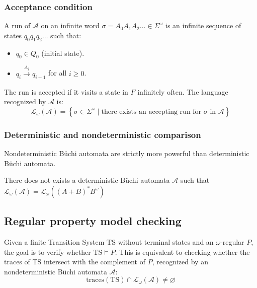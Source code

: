 \subsubsection{Acceptance condition}
A run of $\mathcal{A}$ on an infinite word $\sigma=A_0A_1A_2\dots\in\Sigma^\omega$ is an infinite sequence of states $q_0q_1q_2\dots$ such that: 
\begin{itemize}
    \item $q_0\in Q_0$ (initial state). 
    \item $q_i\xrightarrow{A_i}q_{i+1}$ for all $i\geq 0$. 
\end{itemize}
\noindent The run is accepted if it visits a state in $F$ infinitely often.
The language recognized by $\mathcal{A}$ is: 
\[\mathcal{L}_{\omega}(\mathcal{A})=\left\{\sigma\in\Sigma^\omega\mid\text{there exists an accepting run for }\sigma\text{ in }\mathcal{A}\right\}\]

\subsubsection{Deterministic and nondeterministic comparison}
Nondeterministic Büchi automata are strictly more powerful than deterministic Büchi automata. 
\begin{theorem}
    There does not exists a deterministic Büchi automata $\mathcal{A}$ such that $\mathcal{L}_{\omega}(\mathcal{A})=\mathcal{L}_{\omega}((A+B)^\ast B^\omega)$
\end{theorem}

\subsection{Regular property model checking}
Given a finite Transition System $\text{TS}$ without terminal states and an $\omega$-regular $P$, the goal is to verify whether $\text{TS} \models P$.
This is equivalent to checking whether the traces of $\text{TS}$ intersect with the complement of $P$, recognized by an nondeterministic Büchi automata $\mathcal{A}$: 
\[\text{traces}(\text{TS})\cap\mathcal{L}_{\omega}(\mathcal{A})\neq\varnothing\]

